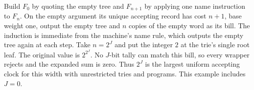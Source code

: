 Build $F_0$ by quoting the empty tree and $F_{n+1}$ by applying one name instruction to $F_n$. On the empty argument its unique accepting record has cost $n+1$, base weight one, output the empty tree and $n$ copies of the empty word as its bill. The induction is immediate from the machine's name rule, which outputs the empty tree again at each step. Take $n=2^J$ and put the integer $2$ at the trie's single root leaf. The original value is $2^{2^J}$. No $J$-bit tally can match this bill, so every wrapper rejects and the expanded sum is zero. Thus $2^J$ is the largest uniform accepting clock for this width with unrestricted tries and programs. This example includes $J=0$.

